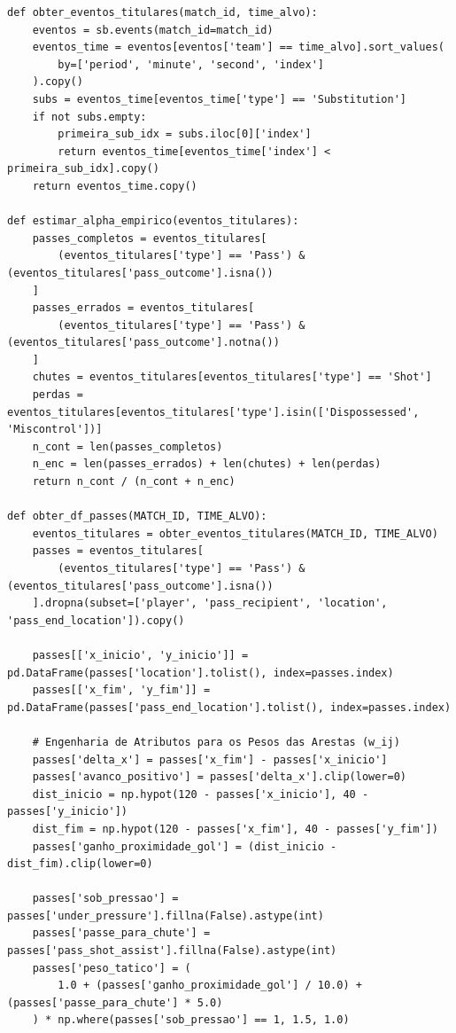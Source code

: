 \documentclass[10pt,a4paper]{article}
\theoremstyle{definition}
\theoremstyle{plain}
\theoremstyle{remark}
\begin{document}
\begin{lstlisting}[caption={Isolamento até a primeira substituição, cálculo de $\alpha$ e engenharia de atributos em \texttt{obter\_df\_passes}.}]
def obter_eventos_titulares(match_id, time_alvo):
    eventos = sb.events(match_id=match_id)
    eventos_time = eventos[eventos['team'] == time_alvo].sort_values(
        by=['period', 'minute', 'second', 'index']
    ).copy()
    subs = eventos_time[eventos_time['type'] == 'Substitution']
    if not subs.empty:
        primeira_sub_idx = subs.iloc[0]['index']
        return eventos_time[eventos_time['index'] < primeira_sub_idx].copy()
    return eventos_time.copy()

def estimar_alpha_empirico(eventos_titulares):
    passes_completos = eventos_titulares[
        (eventos_titulares['type'] == 'Pass') & (eventos_titulares['pass_outcome'].isna())
    ]
    passes_errados = eventos_titulares[
        (eventos_titulares['type'] == 'Pass') & (eventos_titulares['pass_outcome'].notna())
    ]
    chutes = eventos_titulares[eventos_titulares['type'] == 'Shot']
    perdas = eventos_titulares[eventos_titulares['type'].isin(['Dispossessed', 'Miscontrol'])]
    n_cont = len(passes_completos)
    n_enc = len(passes_errados) + len(chutes) + len(perdas)
    return n_cont / (n_cont + n_enc)

def obter_df_passes(MATCH_ID, TIME_ALVO):
    eventos_titulares = obter_eventos_titulares(MATCH_ID, TIME_ALVO)
    passes = eventos_titulares[
        (eventos_titulares['type'] == 'Pass') & (eventos_titulares['pass_outcome'].isna())
    ].dropna(subset=['player', 'pass_recipient', 'location', 'pass_end_location']).copy()

    passes[['x_inicio', 'y_inicio']] = pd.DataFrame(passes['location'].tolist(), index=passes.index)
    passes[['x_fim', 'y_fim']] = pd.DataFrame(passes['pass_end_location'].tolist(), index=passes.index)

    # Engenharia de Atributos para os Pesos das Arestas (w_ij)
    passes['delta_x'] = passes['x_fim'] - passes['x_inicio']
    passes['avanco_positivo'] = passes['delta_x'].clip(lower=0)
    dist_inicio = np.hypot(120 - passes['x_inicio'], 40 - passes['y_inicio'])
    dist_fim = np.hypot(120 - passes['x_fim'], 40 - passes['y_fim'])
    passes['ganho_proximidade_gol'] = (dist_inicio - dist_fim).clip(lower=0)

    passes['sob_pressao'] = passes['under_pressure'].fillna(False).astype(int)
    passes['passe_para_chute'] = passes['pass_shot_assist'].fillna(False).astype(int)
    passes['peso_tatico'] = (
        1.0 + (passes['ganho_proximidade_gol'] / 10.0) + (passes['passe_para_chute'] * 5.0)
    ) * np.where(passes['sob_pressao'] == 1, 1.5, 1.0)


\end{lstlisting}
\end{document}
